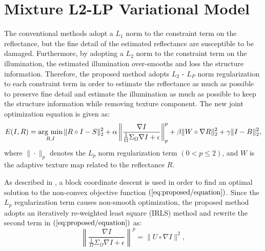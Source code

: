 \section{Mixture L2-LP Variational Model} \label{sec:L2-LP}
The conventional methods adopt a $L_{1}$ norm to the constraint term on the reflectance, but the fine detail of the estimated reflectance are susceptible to be damaged. Furthermore, by adopting a $L_{2}$ norm to the constraint term on the illumination, the estimated illumination over-smooths and loss the structure information. Therefore, the proposed method adopts $L_{2}$ - $L_{P}$ norm regularization to each constraint term in order to estimate the reflectance as much as possible to preserve fine detail and estimate the illumination as much as possible to keep the structure information while removing texture component.
The new joint optimization equation is given as:
\begin{equation}
E(I, R) = \mathop{\rm arg~min}\limits_{R, I} \|R \circ I - S\|_{2}^{2} + \alpha \left \|\frac{\nabla{I}}{\frac{1}{\Omega}\Sigma_{\Omega}\nabla{I}+\epsilon}\right\|_{p}^{p} + \beta \|W \circ \nabla{R}\|_{2}^{2} + \gamma \|I - B\|_{2}^{2}, \label{eq:proposed/equation}
\end{equation}
where $\| \cdot \|_{p}$ denotes the $L_{p}$ norm regularization term $(0 < p \leq 2)$, and $W$ is the adaptive texture map related to the reflectance $R$.\par
As described in \cite{l2-lp}, a block coordinate descent \cite{block} is used in order to find an optimal solution to the non-convex objective function $(\ref{eq:proposed/equation})$. Since the $L_{p}$ regularization term causes non-smooth optimization, the proposed method adopts an iteratively re-weighted least square (IRLS) method \cite{iterate} and rewrite the second term in $(\ref{eq:proposed/equation})$ as:
\begin{equation}
\left \|\frac{\nabla{I}}{\frac{1}{\Omega}\Sigma_{\Omega}\nabla{I}+\epsilon}\right\|^{p} = \|U \circ \nabla{I}\|^{2}, \label{eq:approximation}
\end{equation}

